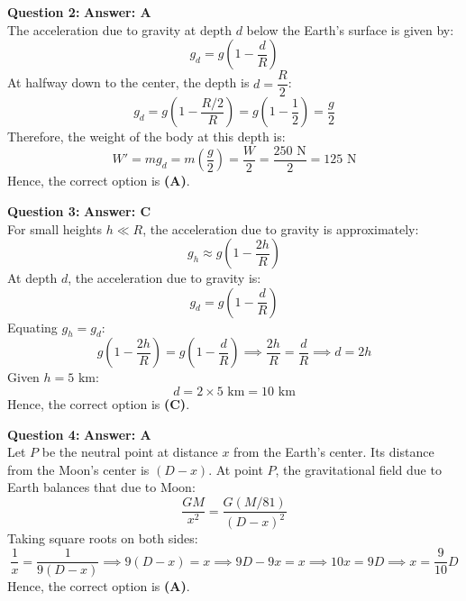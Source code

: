 \documentclass[11pt,a4paper]{article}
\begin{document}
\begin{tcolorbox}[solbox]
  \textbf{\textcolor{primaryDark}{Question 2:}} \hfill \textbf{\textcolor{l1Green}{Answer: A}}\\
  \vspace{3pt}
  The acceleration due to gravity at depth $d$ below the Earth's surface is given by:
$$g_d = g\left(1 - \frac{d}{R}\right)$$
\vspace{3pt}
At halfway down to the center, the depth is $d = \dfrac{R}{2}$:
$$g_d = g\left(1 - \frac{R/2}{R}\right) = g\left(1 - \frac{1}{2}\right) = \frac{g}{2}$$
\vspace{3pt}
Therefore, the weight of the body at this depth is:
$$W' = m g_d = m \left(\frac{g}{2}\right) = \frac{W}{2} = \frac{250\text{ N}}{2} = 125\text{ N}$$
\vspace{3pt}
Hence, the correct option is \textbf{(A)}.
\end{tcolorbox}
\vspace{3pt}

\begin{tcolorbox}[solbox]
  \textbf{\textcolor{primaryDark}{Question 3:}} \hfill \textbf{\textcolor{l1Green}{Answer: C}}\\
  \vspace{3pt}
  For small heights $h \ll R$, the acceleration due to gravity is approximately:
$$g_h \approx g\left(1 - \frac{2h}{R}\right)$$
\vspace{3pt}
At depth $d$, the acceleration due to gravity is:
$$g_d = g\left(1 - \frac{d}{R}\right)$$
\vspace{3pt}
Equating $g_h = g_d$:
$$g\left(1 - \frac{2h}{R}\right) = g\left(1 - \frac{d}{R}\right) \implies \frac{2h}{R} = \frac{d}{R} \implies d = 2h$$
\vspace{3pt}
Given $h = 5\text{ km}$:
$$d = 2 \times 5\text{ km} = 10\text{ km}$$
\vspace{3pt}
Hence, the correct option is \textbf{(C)}.
\end{tcolorbox}
\vspace{3pt}

\begin{tcolorbox}[solbox]
  \textbf{\textcolor{primaryDark}{Question 4:}} \hfill \textbf{\textcolor{l1Green}{Answer: A}}\\
  \vspace{3pt}
  Let $P$ be the neutral point at distance $x$ from the Earth's center. Its distance from the Moon's center is $(D - x)$.
\vspace{3pt}
At point $P$, the gravitational field due to Earth balances that due to Moon:
$$\frac{GM}{x^2} = \frac{G(M/81)}{(D - x)^2}$$
\vspace{3pt}
Taking square roots on both sides:
$$\frac{1}{x} = \frac{1}{9(D - x)} \implies 9(D - x) = x \implies 9D - 9x = x \implies 10x = 9D \implies x = \frac{9}{10}D$$
\vspace{3pt}
Hence, the correct option is \textbf{(A)}.
\end{tcolorbox}
\vspace{3pt}
\end{document}
